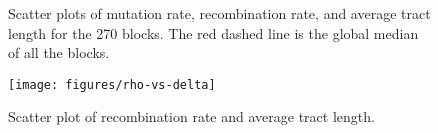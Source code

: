 \documentclass[english]{article}
\newcommand{\lyxdot}{.}
\begin{document}
\begin{figure}


\caption{\label{fig:scatter3}Scatter plots of mutation rate, recombination
rate, and average tract length for the 270 blocks. The red dashed
line is the global median of all the blocks.}
\end{figure}
\clearpage{}%

\begin{figure}
\begin{center}
\texttt{[image: figures/rho-vs-delta]}
\end{center}
\vspace{-.3in}
\caption{Scatter plot of recombination rate and average tract length.}
\label{fig:rhologdelta}
\end{figure}
\clearpage{}%
\end{document}
